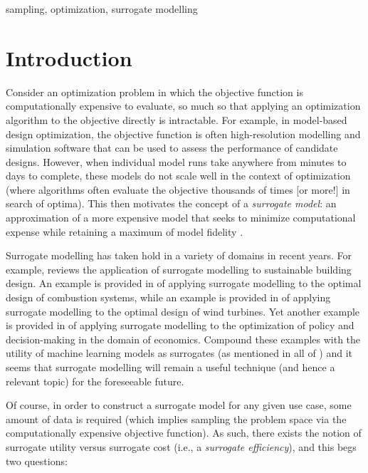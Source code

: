 \documentclass[conference]{IEEEtran}
\begin{document}
\begin{IEEEkeywords}
sampling, optimization, surrogate modelling
\end{IEEEkeywords}



\section{Introduction}

	Consider an optimization problem in which the objective function is computationally expensive to evaluate, so much so that applying an optimization algorithm to the objective directly is intractable. For example, in model-based design optimization, the objective function is often high-resolution modelling and simulation software that can be used to assess the performance of candidate designs. However, when individual model runs take anywhere from minutes to days to complete, these models do not scale well in the context of optimization (where algorithms often evaluate the objective thousands of times [or more!] in search of optima). This then motivates the concept of a \textit{surrogate model}: an approximation of a more expensive model that seeks to minimize computational expense while retaining a maximum of model fidelity \cite{Forrester_2008}.

	Surrogate modelling has taken hold in a variety of domains in recent years. For example, \cite{Westermann_2019} reviews the application of surrogate modelling to sustainable building design. An example is provided in \cite{Liu_2023} of applying surrogate modelling to the optimal design of combustion systems, while an example is provided in \cite{Haghi_2022} of applying surrogate modelling to the optimal design of wind turbines. Yet another example is provided in \cite{vanderHoog_2018} of applying surrogate modelling to the optimization of policy and decision-making in the domain of economics. Compound these examples with the utility of machine learning models as surrogates (as mentioned in all of \cite{Westermann_2019, Liu_2023, vanderHoog_2018}) and it seems that surrogate modelling will remain a useful technique (and hence a relevant topic) for the foreseeable future.
	
	Of course, in order to construct a surrogate model for any given use case, some amount of data is required (which implies sampling the problem space via the computationally expensive objective function). As such, there exists the notion of surrogate utility versus surrogate cost (i.e., a \textit{surrogate efficiency}), and this begs two questions:
	
\end{document}
